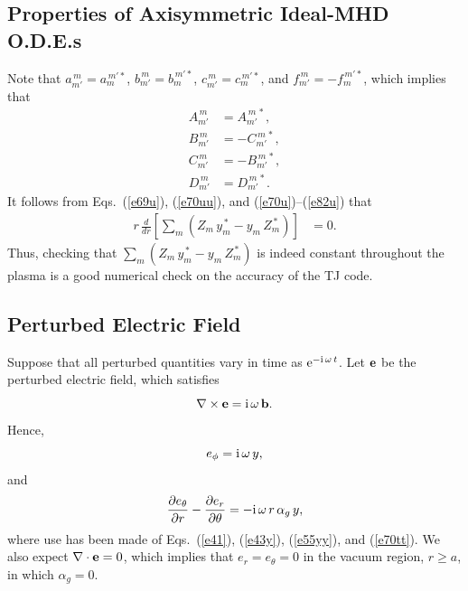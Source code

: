 \documentclass[12pt,prb,aps]{revtex4-1}
\begin{document}
\subsection{Properties of Axisymmetric Ideal-MHD O.D.E.s}
Note   that
$a_{m'}^{\,m} =a_{m}^{\,m'\ast}$, 
$b_{m'}^{\,m} =b_{m}^{\,m'\ast}$, 
$c_{m'}^{\,m} =c_{m}^{\,m'\ast}$, and 
$f_{m'}^{\,m} =-f_{m}^{\,m'\ast}$,
which implies that
\begin{align}\label{e70u}
A_{m'}^{\,m} &= A_{m'}^{\,m\,\ast},\\[0.5ex]
B_{m'}^{\,m} &= -C_{m'}^{\,m\,\ast},\\[0.5ex]
C_{m'}^{\,m} &= -B_{m'}^{\,m\,\ast},\\[0.5ex]
D_{m'}^{\,m} &= D_{m'}^{\,m\,\ast}.\label{e82u}
\end{align}
It follows from Eqs.~(\ref{e69u}), (\ref{e70uu}), and (\ref{e70u})--(\ref{e82u}) that 
\begin{align}
r\,\frac{d}{dr}\!\left[\sum_m (Z_m\,y_m^{\,\ast}- y_m\,Z_m^{\,\ast}) \right]&= 0.
\end{align}
Thus, checking that $\sum_m (Z_m\,y_m^{\,\ast}- y_m\,Z_m^{\,\ast})$ is indeed constant throughout the plasma is a good numerical check on the accuracy of the TJ
code. 

\subsection{Perturbed Electric Field}
Suppose that all perturbed quantities vary in time as ${\rm e}^{-{\rm i}\,\omega\,t}$. 
Let ${\bf e}$ be the perturbed electric field, which satisfies 
\begin{equation}
\nabla\times {\bf e} = {\rm i}\,\omega\,{\bf b}.
\end{equation}
Hence,
\begin{equation}\label{ephi}
e_\phi = {\rm i}\,\omega\,y,
\end{equation}
and 
\begin{equation}\label{e81op}
\frac{\partial e_\theta}{\partial r} - \frac{\partial e_r}{\partial\theta} = - {\rm i}\,\omega\,r\,\alpha_g\,y,
\end{equation}
where use has been made of Eqs.~(\ref{e41}), (\ref{e43y}),  (\ref{e55yy}), and (\ref{e70tt}). 
We also expect $\nabla\cdot{\bf e} =0$, which implies that 
$e_r=e_\theta=0$ in the vacuum region, $r\geq a$, in which $\alpha_g=0$. 
\end{document}
